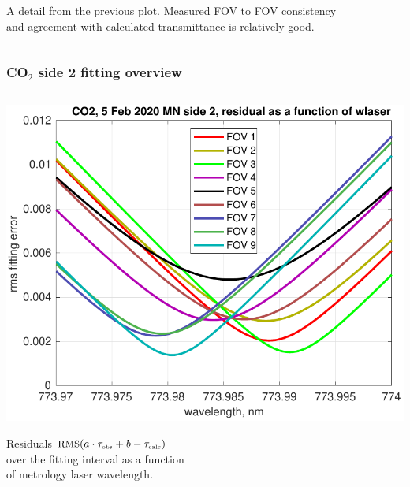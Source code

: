 \documentclass[9pt]{beamer}
\begin{document}
\begin{frame}
\begin{columns}[t]
\begin{column}{0.5\textwidth}
A detail from the previous plot.  Measured FOV to FOV consistency \\
and agreement with calculated transmittance is relatively good.

\end{column}
\end{columns}
\end{frame}
\begin{frame}
\frametitle{CO$_2$ side 2 fitting overview}
\begin{columns}[t]
\begin{column}{0.5\textwidth}  
  \begin{centering}
  \includegraphics[width=\textwidth]{02-05_mn_s2_CO2/CO2_wlaser_fit.pdf}
  \end{centering}\vspace{3mm}

Residuals $\mbox{\small RMS}(a\cdot\tau_{\mbox{\tiny obs}} + b - \tau_{\mbox{\tiny calc}})$ \\ over the fitting
interval as a function \\ of metrology laser wavelength.

\end{column}


\end{columns}
\end{frame}
\end{document}
